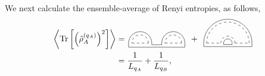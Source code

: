 \documentclass[aps,pra,reprint,superscriptaddress,twocolumn,notitlepage]{revtex4-1}
\newcommand{\Tr}{\text{Tr}}
\numberwithin{equation}{section}
\begin{document}
We next calculate the ensemble-average of Renyi entropies, as follows,
\begin{align}
    \left\langle \Tr \left[ \left( \hat\rho_{A}^{(q_A)} \right)^2 \right] \right\rangle 
    &=
    \,
    \tikz[scale=0.7,baseline=0.5ex]{
    \draw[dashed] (0,0) -- (1,0);
    \draw (-0.2,0.)-- (-0.2,-0.25);
    \draw (1.2,-0.1)-- (1.2,0.);
    \draw[dashed] (2,0) -- (3,0);
    \draw (1.8,0.)-- (1.8,-0.1);
    \draw (3.2,-0.25)-- (3.2,0.);
    \draw (1.2,-0.1)-- (1.8,-0.1);
    \draw (-0.2,-0.25) -- (3.2,-0.25);
    \draw[dashed] (1.0,0) arc (0:180:0.5);
    \draw[dashed] (3.0,0) arc (0:180:0.5);
    \draw (1.2,0) arc (0:180:0.7);
    \draw (3.2,0) arc (0:180:0.7);
    }
\ \,
+
\ \,
    \tikz[scale=0.6,baseline=0.5ex]{
    \draw[dashed] (0,0) -- (1,0);
    \draw (-0.2,0.)-- (-0.2,-0.25);
    \draw (1.2,-0.1)-- (1.2,0.);
    \draw[dashed] (2,0) -- (3,0);
    \draw (1.8,0.)-- (1.8,-0.1);
    \draw (3.2,-0.25)-- (3.2,0.);
    \draw (1.2,-0.1)-- (1.8,-0.1);
    \draw (-0.2,-0.25) -- (3.2,-0.25);
    \draw[dashed] (2.0,0) arc (0:180:0.5);
    \draw[dashed] (3.0,0) arc (0:180:1.5);
    \draw (1.8,0) arc (0:180:0.3);
    \draw (3.2,0) arc (0:180:1.7);
    }
\ \,
\nonumber
\\
&=\frac{1}{L_{q_A}} + \frac{1}{L_{q_B}},
\end{align}
\end{document}
